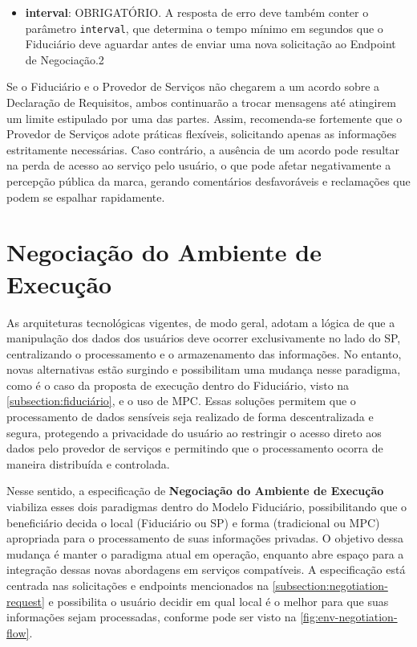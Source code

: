 \begin{itemize}
    \item \textbf{interval}: OBRIGATÓRIO. A resposta de erro deve também conter o parâmetro \texttt{interval}, que determina o tempo mínimo em segundos que o Fiduciário deve aguardar antes de enviar uma nova solicitação ao Endpoint de Negociação.2
    
\end{itemize}


Se o Fiduciário e o Provedor de Serviços não chegarem a um acordo sobre a Declaração de Requisitos, ambos continuarão a trocar mensagens até atingirem um limite estipulado por uma das partes. Assim, recomenda-se fortemente que o Provedor de Serviços adote práticas flexíveis, solicitando apenas as informações estritamente necessárias. Caso contrário, a ausência de um acordo pode resultar na perda de acesso ao serviço pelo usuário, o que pode afetar negativamente a percepção pública da marca, gerando comentários desfavoráveis e reclamações que podem se espalhar rapidamente.

% 


\clearpage
\section{Negociação do Ambiente de Execução}\label{section:env-negotiation}

As arquiteturas tecnológicas vigentes, de modo geral, adotam a lógica de que a manipulação dos dados dos usuários deve ocorrer exclusivamente no lado do \acs{SP}, centralizando o processamento e o armazenamento das informações. No entanto, novas alternativas estão surgindo e possibilitam uma mudança nesse paradigma, como é o caso da proposta de execução dentro do Fiduciário, visto na \autoref{subsection:fiduciário}, e o uso de \acs{MPC}. Essas soluções permitem que o processamento de dados sensíveis seja realizado de forma descentralizada e segura, protegendo a privacidade do usuário ao restringir o acesso direto aos dados pelo provedor de serviços e permitindo que o processamento ocorra de maneira distribuída e controlada. 

Nesse sentido, a especificação de \textbf{Negociação do Ambiente de Execução} viabiliza esses dois paradigmas dentro do Modelo Fiduciário, possibilitando que o beneficiário decida o local (Fiduciário ou \acs{SP}) e forma (tradicional ou \acs{MPC}) apropriada para o processamento de suas informações privadas. O objetivo dessa mudança é manter o paradigma atual em operação, enquanto abre espaço para a integração dessas novas abordagens em serviços compatíveis. A especificação está centrada nas solicitações e endpoints mencionados na \autoref{subsection:negotiation-request} e possibilita o usuário decidir em qual local é o melhor para que suas informações sejam processadas, conforme pode ser visto na \autoref{fig:env-negotiation-flow}.

